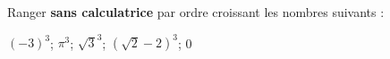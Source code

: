 
Ranger \textbf{sans calculatrice} par ordre croissant les nombres suivants :

 $(-3)^3$; $\pi^3$; $\sqrt{3}^3$; $\left(\sqrt{2}-2\right)^3$; 0

